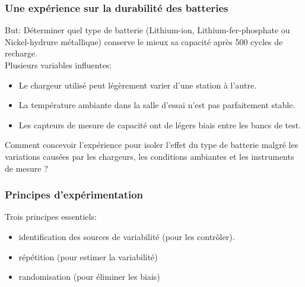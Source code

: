 \documentclass{BeamerTemplate}
\begin{document}
\begin{frame}[t] \frametitle{Une expérience sur la durabilité des batteries}


\small

But: Déterminer quel type de batterie (Lithium-ion, Lithium-fer-phosphate ou Nickel-hydrure métallique) conserve le mieux sa capacité après 500 cycles de recharge.\\[2mm]

Plusieurs variables influentes:

     \begin{itemize}
    \item Le chargeur utilisé peut légèrement varier d’une station à l’autre. %
    \item La température ambiante dans la salle d’essai n’est pas parfaitement stable.
    \item Les capteurs de mesure de capacité ont de légers biais entre les bancs de test.
\end{itemize}


Comment concevoir l’expérience pour isoler l’effet du type de batterie malgré les variations causées par les chargeurs, les conditions ambiantes et les instruments de mesure ?


\end{frame}


\begin{frame}[t]
 \frametitle{Principes d'expérimentation}

Trois principes essentiels:\\[2mm]

\begin{itemize}\itemsep7mm
\item identification des sources de variabilité (pour les contrôler).
\item répétition (pour estimer la variabilité)
\item randomisation (pour éliminer les biais)
\end{itemize}
\end{frame}
\end{document}
